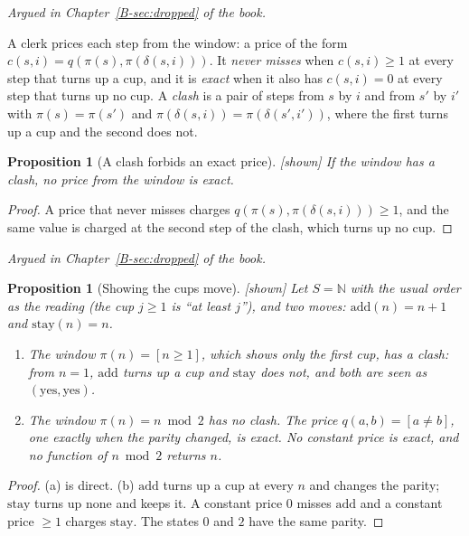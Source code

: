 \documentclass[11pt, a4paper]{article}
\theoremstyle{plain}
\newtheorem{proposition}[theorem]{Proposition}
\theoremstyle{definition}
\theoremstyle{remark}
\newcommand{\N}{\mathbb{N}}
\newcommand{\step}{\delta}
\newcommand{\cost}{c}
\newcommand{\argued}[1]{\par\noindent\textit{Argued in Chapter~\ref{B-#1} of the book.}\par}
\newcommand{\kind}[1]{\textup{[#1]}}
\begin{document}
\argued{sec:dropped}

A clerk prices each step from the window: a price of the form $\cost(s,i)=q(\pi(s),\pi(\step(s,i)))$. It
\emph{never misses} when $\cost(s,i)\ge1$ at every step that turns up a cup, and it is \emph{exact} when it
also has $\cost(s,i)=0$ at every step that turns up no cup. A \emph{clash} is a pair of steps from $s$ by $i$
and from $s'$ by $i'$ with $\pi(s)=\pi(s')$ and $\pi(\step(s,i))=\pi(\step(s',i'))$, where the first turns
up a cup and the second does not.

\begin{proposition}[A clash forbids an exact price]\label{spec:clash-row} \kind{shown}
If the window has a clash, no price from the window is exact.
\end{proposition}

\begin{proof}
A price that never misses charges $q(\pi(s),\pi(\step(s,i)))\ge1$, and the same value is charged at the
second step of the clash, which turns up no cup.
\end{proof}

\argued{sec:dropped}

\begin{proposition}[Showing the cups move]\label{spec:show-move} \kind{shown}
Let $S=\N$ with the usual order as the reading (the cup $j\ge1$ is ``at least $j$''), and two moves:
$\mathrm{add}(n)=n+1$ and $\mathrm{stay}(n)=n$.
\begin{enumerate}[label=(\alph*)]
\item The window $\pi(n)=[n\ge1]$, which shows only the first cup, has a clash: from $n=1$, $\mathrm{add}$
turns up a cup and $\mathrm{stay}$ does not, and both are seen as $(\mathrm{yes},\mathrm{yes})$.
\item The window $\pi(n)=n\bmod 2$ has no clash. The price $q(a,b)=[a\ne b]$, one exactly when the parity
changed, is exact. No constant price is exact, and no function of $n\bmod2$ returns $n$.
\end{enumerate}
\end{proposition}

\begin{proof}
(a) is direct. (b) $\mathrm{add}$ turns up a cup at every $n$ and changes the parity; $\mathrm{stay}$ turns
up none and keeps it. A constant price $0$ misses $\mathrm{add}$ and a constant price $\ge1$ charges
$\mathrm{stay}$. The states $0$ and $2$ have the same parity.
\end{proof}
\end{document}
